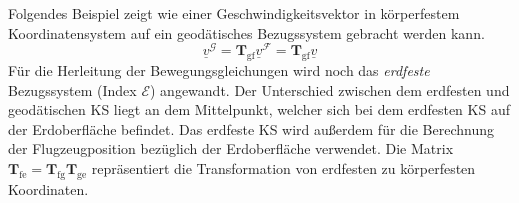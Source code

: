 Folgendes Beispiel zeigt wie einer Geschwindigkeitsvektor in körperfestem Koordinatensystem auf ein geodätisches Bezugssystem gebracht werden kann.\\
\begin{equation*}
\underline{v}^\mathcal{G} = \textbf{T}_\mathrm{gf}\underline{v}^\mathcal{F} = \textbf{T}_\mathrm{gf}\underline{v}
\end{equation*}
Für die Herleitung der Bewegungsgleichungen wird noch das \textit{erdfeste} Bezugssystem (Index $\mathcal{E}$) angewandt. Der Unterschied zwischen dem erdfesten und geodätischen KS liegt an dem Mittelpunkt, welcher sich bei dem erdfesten KS  auf der Erdoberfläche befindet. Das erdfeste KS wird außerdem für die Berechnung der Flugzeugposition bezüglich der Erdoberfläche verwendet. Die Matrix $\textbf{T}_\mathrm{fe} = \textbf{T}_\mathrm{fg}\textbf{T}_\mathrm{ge} $ repräsentiert die Transformation von erdfesten zu körperfesten Koordinaten. 